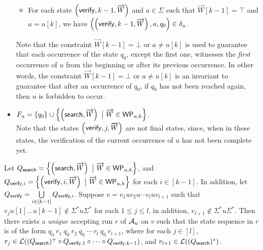 \begin{definition}
\begin{itemize}
\begin{itemize}
		\item For each state $\left(\mathsf{verify}, k-1, \overrightarrow{W} \right)$ and $a \in \Sigma$ such that $\overrightarrow{W}[k-1]=\top$ and $a  = u[k]$, we have $\left(\left(\mathsf{verify}, k-1, \overrightarrow{W} \right), a, q_0\right) \in \delta_u$.
	\end{itemize}
Note that the constraint $\overrightarrow{W}[k-1] = \bot$ or $a \neq u[k]$ is used to guarantee that each occurrence of the state $q_0$, except the first one, witnesses the \emph{first} occurrence of $u$ from the beginning or after its previous occurrence. In other words, the constraint $\overrightarrow{W}[k-1] = \bot$ or $a \neq u[k]$ is an invariant to guarantee that after an occurrence of $q_0$, if $q_0$ has not been reached again,  then $u$ is forbidden to occur.

	\item $F_u= \left\{q_0 \right\} \cup \left\{\left(\search, \overrightarrow{W} \right)\ \big\vert\ \overrightarrow{W} \in \wprof_{u, k} \right\} $. \\
	Note that the states $\left(\mathsf{verify}, j, \overrightarrow{W} \right)$ are not final states, since, when in these states, the verification of the current occurrence of $u$ has not been complete yet.
\end{itemize}
\end{definition}

Let $Q_{\mathsf{search}}  = \left\{ \left(\mathsf{search}, \overrightarrow{W} \right) \ \big\vert\ \overrightarrow{W} \in \mathsf{WP}_{u,k} \right\}$,  and $Q_{\mathsf{verify}, i} = \left\{ \left(\mathsf{verify}, i, \overrightarrow{W} \right) \ \big\vert\ \overrightarrow{W} \in \mathsf{WP}_{u,k} \right\}$ for each $i \in [k-1]$. In addition, let $Q_{\mathsf{verify}} = \bigcup \limits_{i \in [k-1]} Q_{\mathsf{verify},i}$.
Suppose $v = v_1 u v_2 u \cdots v_l u v_{l+1}$ such that $v_j u[1] \dots u[k-1] \not \in \Sigma^\ast u \Sigma^\ast$ for each $1 \le j \le l$, in addition, $v_{l+1} \not \in \Sigma^\ast u \Sigma^\ast$. Then there exists a \emph{unique} accepting run $r$ of $\mathcal{A}_u$ on $v$ such that the state sequence in $r$ is of the form
$q_0\ r_1\ q_0\ r_2\ q_0\ \cdots\ r_l\ q_0\ r_{l+1}$, where for each $j \in [l]$, $r_j \in  \mathcal{L}((Q_{\mathsf{search}})^+ \circ Q_{\mathsf{verify}, 1} \circ \cdots  \circ Q_{\mathsf{verify}, k-1})$, and $r_{l+1} \in \mathcal{L}((Q_{\mathsf{search}})^*)$. 

